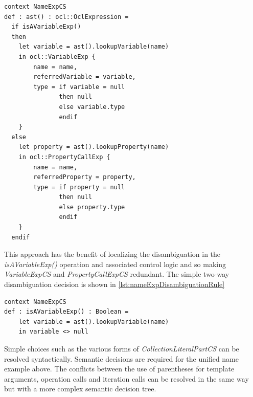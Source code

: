 \documentclass{llncs}
\begin{document}
\begin{lstlisting}[caption=CS2AS description for an ambiguous name expression, label=lst:nameExpDisambiguation, language=OCL]
context NameExpCS
def : ast() : ocl::OclExpression =
  if isAVariableExp() 
  then
    let variable = ast().lookupVariable(name)
    in ocl::VariableExp {
        name = name,
        referredVariable = variable,
        type = if variable = null
               then null
               else variable.type
               endif
    }
  else 
    let property = ast().lookupProperty(name)
    in ocl::PropertyCallExp {
        name = name,
        referredProperty = property,
        type = if property = null
               then null
               else property.type
               endif
    }
  endif	
\end{lstlisting}

This approach has the benefit of localizing the disambiguation in the \emph{isAVariableExp()} operation and associated control logic and so making \emph{VariableExpCS} and \emph{PropertyCallExpCS} redundant. The simple two-way disambiguation decision is shown in \ref{lst:nameExpDisambiguationRule}

\begin{lstlisting}[caption=NameExpCS disambigutation rule, label=lst:nameExpDisambiguationRule, language=OCL]
context NameExpCS
def : isAVariableExp() : Boolean =
	let variable = ast().lookupVariable(name)
	in variable <> null
\end{lstlisting}

Simple choices such as the various forms of \emph{CollectionLiteralPartCS} can be resolved syntactically. Semantic decisions are required for the unified name example above. 
The conflicts between the use of parentheses for template arguments, operation calls and iteration calls can be resolved in the same way but with a more complex semantic decision tree.

\end{document}
